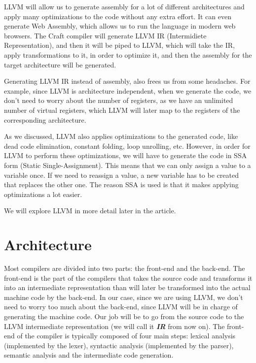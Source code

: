 ﻿\documentclass[10pt,a4paper,twocolumn,twoside]{article}
\begin{document}
LLVM will allow us to generate assembly for a lot of different architectures
and apply many optimizations to the code without any extra effort. It can even
generate Web Assembly, which allows us to run the language in modern web
browsers. The Craft compiler will generate LLVM IR (Intermidiete
Representation), and then it will be piped to LLVM, which will take the IR,
apply transformations to it, in order to optimize it, and then the assembly for
the target architecture will be generated.

Generating LLVM IR instead of assembly, also frees us from some headaches. For
example, since LLVM is architecture independent, when we generate the code, we
don't need to worry about the number of registers, as we have an unlimited
number of virtual registers, which LLVM will later map to the registers of the
corresponding architecture.

As we discussed, LLVM also applies optimizations to the generated code, like
dead code elimination, constant folding, loop unrolling, etc. However, in order
for LLVM to perform these optimizations, we will have to generate the code in
SSA form (Static Single-Assignment). This means that we can only assign a value
to a variable once. If we need to reassign a value, a new variable has to be
created that replaces the other one. The reason SSA is used is that it makes
applying optimizations a lot easier.

We will explore LLVM in more detail later in the article.

\section{Architecture}
Most compilers are divided into two parts: the front-end and the back-end. The
front-end is the part of the compilers that takes the source code and transforms
it into an intermediate representation than will later be transformed into the
actual machine code by the back-end. In our case, since we are using LLVM, we
don't need to worry too much about the back-end, since LLVM will be in charge of
generating the machine code. Our job will be to go from the source code to the
LLVM intermediate representation (we will call it \textbf{\textit{IR}} from now
on). The front-end of the compiler is typically composed of four main steps:
lexical analysis (implemented by the lexer), syntactic analysis (implemented by
the parser), semantic analysis and the intermediate code generation.
\end{document}
